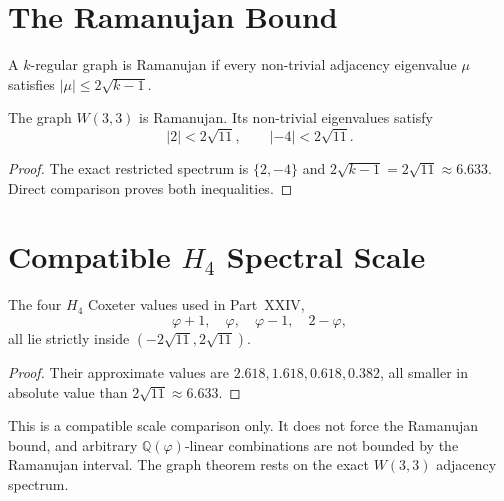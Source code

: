 \section{The Ramanujan Bound}
\label{sec:ramanujan}

\begin{definition}
A $k$-regular graph is Ramanujan if every non-trivial adjacency
eigenvalue $\mu$ satisfies $|\mu|\le 2\sqrt{k-1}$.
\end{definition}

\begin{theorem}
\label{thm:ramanujan}
The graph $W(3,3)$ is Ramanujan.  Its non-trivial eigenvalues satisfy
\begin{equation}
  |2|<2\sqrt{11},
  \qquad
  |-4|<2\sqrt{11}.
  \label{eq:ram_bound}
\end{equation}
\end{theorem}

\begin{proof}
The exact restricted spectrum is $\{2,-4\}$ and
$2\sqrt{k-1}=2\sqrt{11}\approx6.633$.  Direct comparison proves both
inequalities.
\end{proof}

\section{Compatible $H_4$ Spectral Scale}
\label{sec:h4_comparison}

\begin{proposition}
The four $H_4$ Coxeter values used in Part~XXIV,
\begin{equation}
  \varphi+1,\quad \varphi,\quad \varphi-1,\quad 2-\varphi,
\end{equation}
all lie strictly inside $(-2\sqrt{11},2\sqrt{11})$.
\end{proposition}

\begin{proof}
Their approximate values are $2.618,1.618,0.618,0.382$, all smaller in
absolute value than $2\sqrt{11}\approx6.633$.
\end{proof}

\begin{remark}
This is a compatible scale comparison only.  It does not force the
Ramanujan bound, and arbitrary $\mathbb{Q}(\varphi)$-linear combinations
are not bounded by the Ramanujan interval.  The graph theorem rests on
the exact $W(3,3)$ adjacency spectrum.
\end{remark}

